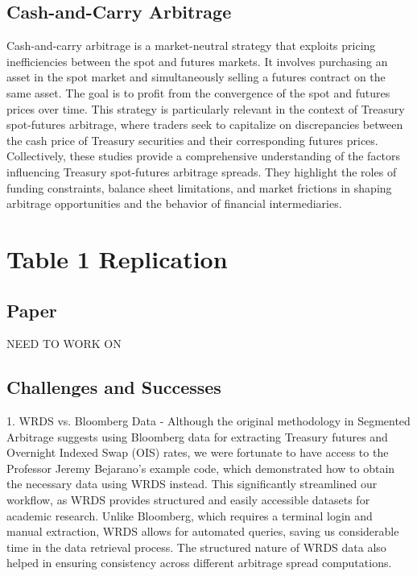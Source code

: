 \documentclass{article}
\begin{document}
\subsection{Cash-and-Carry Arbitrage}
Cash-and-carry arbitrage is a market-neutral strategy that exploits pricing inefficiencies between the spot and futures markets. It involves purchasing an asset in the spot market and simultaneously selling a futures contract on the same asset. The goal is to profit from the convergence of the spot and futures prices over time. This strategy is particularly relevant in the context of Treasury spot-futures arbitrage, where traders seek to capitalize on discrepancies between the cash price of Treasury securities and their corresponding futures prices. ​
Collectively, these studies provide a comprehensive understanding of the factors influencing Treasury spot-futures arbitrage spreads. They highlight the roles of funding constraints, balance sheet limitations, and market frictions in shaping arbitrage opportunities and the behavior of financial intermediaries.

\section{Table 1 Replication}
\subsection{Paper}

NEED TO WORK ON

\subsection{Challenges and Successes}

1. WRDS vs. Bloomberg Data - Although the original methodology in Segmented Arbitrage suggests using Bloomberg data for extracting Treasury futures and Overnight Indexed Swap (OIS) rates, we were fortunate to have access to the Professor Jeremy Bejarano’s example code, which demonstrated how to obtain the necessary data using WRDS instead. This significantly streamlined our workflow, as WRDS provides structured and easily accessible datasets for academic research. Unlike Bloomberg, which requires a terminal login and manual extraction, WRDS allows for automated queries, saving us considerable time in the data retrieval process. The structured nature of WRDS data also helped in ensuring consistency across different arbitrage spread computations.
\end{document}
